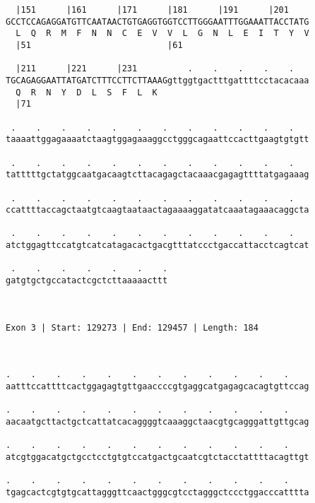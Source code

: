 \documentclass{article}
\begin{document}
\begin{Verbatim}
  |151      |161      |171      |181      |191      |201    
GCCTCCAGAGGATGTTCAATAACTGTGAGGTGGTCCTTGGGAATTTGGAAATTACCTATG
  L  Q  R  M  F  N  N  C  E  V  V  L  G  N  L  E  I  T  Y  V
  |51                           |61                         
  
  |211      |221      |231          .    .    .    .    .   
TGCAGAGGAATTATGATCTTTCCTTCTTAAAGgttggtgactttgattttcctacacaaa
  Q  R  N  Y  D  L  S  F  L  K                              
  |71                                                       
  
 .    .    .    .    .    .    .    .    .    .    .    .   
taaaattggagaaaatctaagtggagaaaggcctgggcagaattccacttgaagtgtgtt
                                                            
 .    .    .    .    .    .    .    .    .    .    .    .   
tatttttgctatggcaatgacaagtcttacagagctacaaacgagagttttatgagaaag
                                                            
 .    .    .    .    .    .    .    .    .    .    .    .   
ccattttaccagctaatgtcaagtaataactagaaaaggatatcaaatagaaacaggcta
                                                            
 .    .    .    .    .    .    .    .    .    .    .    .   
atctggagttccatgtcatcatagacactgacgtttatccctgaccattacctcagtcat
                                                            
 .    .    .    .    .    .    .
gatgtgctgccatactcgctcttaaaaacttt
                                
                                
 
Exon 3 | Start: 129273 | End: 129457 | Length: 184



.    .    .    .    .    .    .    .    .    .    .    .    
aatttccattttcactggagagtgttgaaccccgtgaggcatgagagcacagtgttccag
                                                            
.    .    .    .    .    .    .    .    .    .    .    .    
aacaatgcttactgctcattatcacaggggtcaaaggctaacgtgcagggattgttgcag
                                                            
.    .    .    .    .    .    .    .    .    .    .    .    
atcgtggacatgctgcctcctgtgtccatgactgcaatcgtctacctattttacagttgt
                                                            
.    .    .    .    .    .    .    .    .    .    .    .    
tgagcactcgtgtgcattagggttcaactgggcgtcctagggctccctggacccatttta
                                                            

\end{Verbatim}
\end{document}
